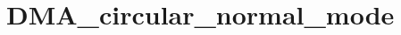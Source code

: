 \hypertarget{group___d_m_a__circular__normal__mode}{\section{D\-M\-A\-\_\-circular\-\_\-normal\-\_\-mode}
\label{group___d_m_a__circular__normal__mode}
}
